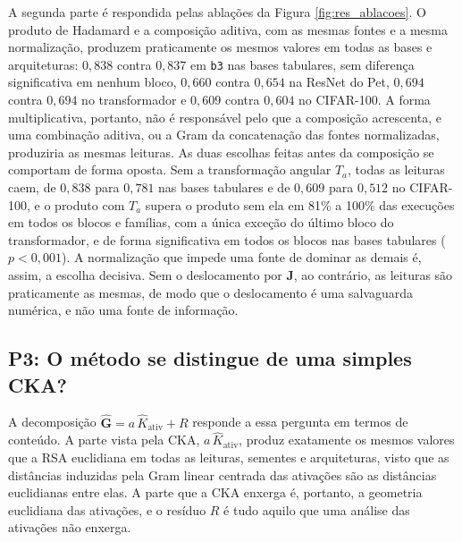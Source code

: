 A segunda parte é respondida pelas ablações da Figura \ref{fig:res_ablacoes}. O produto de Hadamard e a composição aditiva, com as mesmas fontes e a mesma normalização, produzem praticamente os mesmos valores em todas as bases e arquiteturas: $0{,}838$ contra $0{,}837$ em \texttt{b3} nas bases tabulares, sem diferença significativa em nenhum bloco, $0{,}660$ contra $0{,}654$ na ResNet do Pet, $0{,}694$ contra $0{,}694$ no transformador e $0{,}609$ contra $0{,}604$ no CIFAR-100. A forma multiplicativa, portanto, não é responsável pelo que a composição acrescenta, e uma combinação aditiva, ou a Gram da concatenação das fontes normalizadas, produziria as mesmas leituras. As duas escolhas feitas antes da composição se comportam de forma oposta. Sem a transformação angular $T_a$, todas as leituras caem, de $0{,}838$ para $0{,}781$ nas bases tabulares e de $0{,}609$ para $0{,}512$ no CIFAR-100, e o produto com $T_a$ supera o produto sem ela em 81\% a 100\% das execuções em todos os blocos e famílias, com a única exceção do último bloco do transformador, e de forma significativa em todos os blocos nas bases tabulares ($p < 0{,}001$). A normalização que impede uma fonte de dominar as demais é, assim, a escolha decisiva. Sem o deslocamento por $\mathbf{J}$, ao contrário, as leituras são praticamente as mesmas, de modo que o deslocamento é uma salvaguarda numérica, e não uma fonte de informação.

\subsection{P3: O método se distingue de uma simples CKA?}\label{subsec:res_cka}

A decomposição $\hat{\mathbf{G}} = a\,\hat{K}_{\mathrm{ativ}} + R$ responde a essa pergunta em termos de conteúdo. A parte vista pela CKA, $a\,\hat{K}_{\mathrm{ativ}}$, produz exatamente os mesmos valores que a RSA euclidiana em todas as leituras, sementes e arquiteturas, visto que as distâncias induzidas pela Gram linear centrada das ativações são as distâncias euclidianas entre elas. A parte que a CKA enxerga é, portanto, a geometria euclidiana das ativações, e o resíduo $R$ é tudo aquilo que uma análise das ativações não enxerga.

